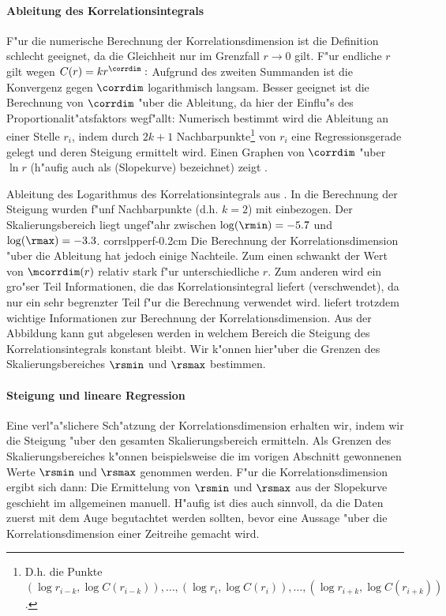 \paragraph{Ableitung des Korrelationsintegrals}
F"ur die numerische Berechnung der Korrelationsdimension ist die Definition
 schlecht geeignet, da die Gleichheit nur im Grenzfall $r\to 0$ gilt. F"ur 
endliche $r$ gilt wegen $C(r)=k r^{\corrdim}:$
Aufgrund des zweiten Summanden ist die Konvergenz gegen $\corrdim$ logarithmisch langsam.
Besser geeignet ist die Berechnung von $\corrdim$ "uber die Ableitung, da hier der Einflu"s
des Proportionalit"atsfaktors wegf"allt:
Numerisch bestimmt wird die Ableitung an einer Stelle $r_i$, indem durch $2k+1$
Nachbarpunkte\footnote{D.h. die Punkte $(\log r_{i-k}, \log C(r_{i-k})),\dots,(\log r_i,
\log C(r_i)),\dots,(\log r_{i+k}, \log C(r_{i+k}))$. } von $r_i$ eine Regressionsgerade
gelegt und deren Steigung ermittelt wird. Einen Graphen von $\corrdim$ "uber $\ln r$
(h"aufig auch als \begriff(Slopekurve) bezeichnet) zeigt .

{Ableitung des Logarithmus des Korrelationsintegrals aus . In die
Berechnung der Steigung wurden f"unf Nachbarpunkte (d.h. $k=2$) mit einbezogen. Der
Skalierungsbereich liegt ungef"ahr zwischen $\log(\rmin)=-5.7$ und $\log(\rmax)=-3.3$.}
{corrslpperf}{-0.2cm}
Die Berechnung der Korrelationsdimension "uber die Ableitung hat jedoch einige
Nachteile. Zum einen schwankt der Wert von $\mcorrdim(r)$ relativ stark f"ur
unterschiedliche $r$. Zum anderen wird ein gro"ser Teil Informationen, die das
Korrelationsintegral liefert \naja(verschwendet), da nur ein sehr begrenzter Teil f"ur
die Berechnung verwendet wird.  liefert trotzdem wichtige Informationen zur 
Berechnung der Korrelationsdimension. Aus der Abbildung 
kann gut abgelesen werden in welchem Bereich die Steigung des
Korrelationsintegrals konstant bleibt. Wir k"onnen hier"uber die Grenzen des
Skalierungsbereiches $\rsmin$ und $\rsmax$ bestimmen. 

\paragraph{Steigung und lineare Regression}
Eine verl"a"slichere Sch"atzung der Korrelationsdimension erhalten wir, indem wir die
Steigung "uber den gesamten Skalierungsbereich ermitteln. Als Grenzen des
Skalierungsbereiches k"onnen beispielsweise die im vorigen Abschnitt gewonnenen Werte
$\rsmin$ und $\rsmax$ genommen werden. F"ur die Korrelationsdimension ergibt sich dann:
Die Ermittelung von $\rsmin$ und $\rsmax$ aus der Slopekurve geschieht im allgemeinen
manuell. H"aufig ist dies auch sinnvoll, da die Daten zuerst mit dem Auge begutachtet
werden sollten, bevor eine Aussage "uber die Korrelationsdimension einer Zeitreihe gemacht
wird. 

